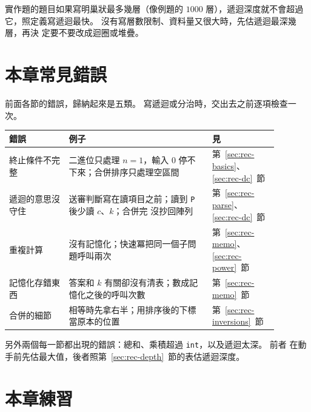 \begin{apcsnote}
實作題的題目如果寫明巢狀最多幾層（像例題的 $1000$ 層），遞迴深度就不會超過
它，照定義寫遞迴最快。 沒有寫層數限制、資料量又很大時，先估遞迴最深幾層，再決
定要不要改成迴圈或堆疊。
\end{apcsnote}

\section{本章常見錯誤}
\label{sec:rec-pitfalls}

前面各節的錯誤，歸納起來是五類。 寫遞迴或分治時，交出去之前逐項檢查一次。

\begin{center}
\begin{tabular}{p{0.2\linewidth}p{0.48\linewidth}p{0.2\linewidth}}
\toprule
錯誤 & 例子 & 見 \\
\midrule
終止條件不完整 & 二進位只處理 $n = 1$，輸入 $0$ 停不下來；合併排序只處理空區間 &
第~\ref{sec:rec-basics}、\ref{sec:rec-dc}~節 \\
遞迴的意思沒守住 & 送審判斷寫在讀項目之前；讀到 \texttt{P} 後少讀 $c$、$k$；合併完
沒抄回陣列 & 第~\ref{sec:rec-parse}、\ref{sec:rec-dc}~節 \\
重複計算 & 沒有記憶化；快速冪把同一個子問題呼叫兩次 &
第~\ref{sec:rec-memo}、\ref{sec:rec-power}~節 \\
記憶化存錯東西 & 答案和 $k$ 有關卻沒有清表；數成記憶化之後的呼叫次數 &
第~\ref{sec:rec-memo}~節 \\
合併的細節 & 相等時先拿右半；用排序後的下標當原本的位置 &
第~\ref{sec:rec-inversions}~節 \\
\bottomrule
\end{tabular}
\end{center}

另外兩個每一節都出現的錯誤：總和、乘積超過 \texttt{int}，以及遞迴太深。 前者
在動手前先估最大值，後者照第~\ref{sec:rec-depth}~節的表估遞迴深度。

\section{本章練習}
\label{sec:ch8-exercises}

